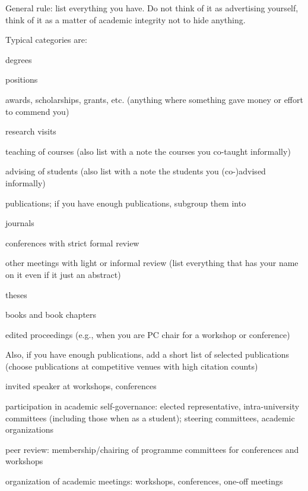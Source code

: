 \documentclass[12pt]{article}
\begin{document}
General rule: list everything you have.
Do not think of it as advertising yourself, think of it as a matter of academic integrity not to hide anything.

Typical categories are:
\begin{compactitem}
 \item degrees
 \item positions
 \item awards, scholarships, grants, etc. (anything where something gave money or effort to commend you)
 \item research visits
 \item teaching of courses (also list with a note the courses you co-taught informally)
 \item advising of students (also list with a note the students you (co-)advised informally) 
 \item publications; if you have enough publications, subgroup them into
  \begin{compactitem}
   \item journals
   \item conferences with strict formal review
   \item other meetings with light or informal review (list everything that has your name on it even if it just an abstract)
   \item theses
   \item books and book chapters
   \item edited proceedings (e.g., when you are PC chair for a workshop or conference)
  \end{compactitem}
  Also, if you have enough publications, add a short list of selected publications (choose publications at competitive venues with high citation counts)
 \item invited speaker at workshops, conferences
 \item participation in academic self-governance: elected representative, intra-university committees (including those when as a student); steering committees, academic organizations
 \item peer review: membership/chairing of programme committees for conferences and workshops
 \item organization of academic meetings: workshops, conferences, one-off meetings
\end{compactitem}

\end{document}
